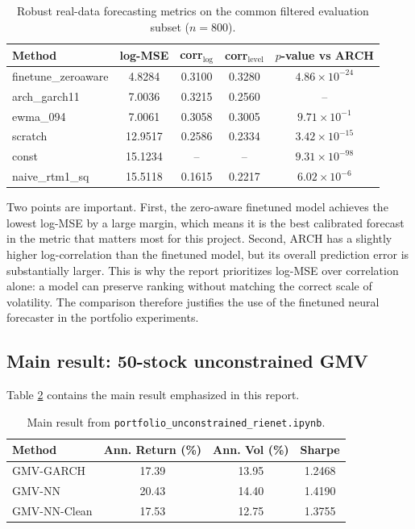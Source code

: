 \documentclass[11pt,a4paper]{article}
\begin{document}
\begin{table}[H]
\centering
\caption{Robust real-data forecasting metrics on the common filtered evaluation subset ($n=800$).}
\label{tab:real-forecast-metrics}
\small
\begin{tabular}{lcccc}
\toprule
Method & log-MSE & corr$_{\log}$ & corr$_{\mathrm{level}}$ & $p$-value vs ARCH \\
\midrule
finetune\_zeroaware & 4.8284 & 0.3100 & 0.3280 & $4.86 \times 10^{-24}$ \\
arch\_garch11 & 7.0036 & 0.3215 & 0.2560 & -- \\
ewma\_094 & 7.0061 & 0.3058 & 0.3005 & $9.71 \times 10^{-1}$ \\
scratch & 12.9517 & 0.2586 & 0.2334 & $3.42 \times 10^{-15}$ \\
const & 15.1234 & -- & -- & $9.31 \times 10^{-98}$ \\
naive\_rtm1\_sq & 15.5118 & 0.1615 & 0.2217 & $6.02 \times 10^{-6}$ \\
\bottomrule
\end{tabular}
\end{table}

Two points are important. First, the zero-aware finetuned model achieves the lowest log-MSE by a large margin, which means it is the best calibrated forecast in the metric that matters most for this project. Second, ARCH has a slightly higher log-correlation than the finetuned model, but its overall prediction error is substantially larger. This is why the report prioritizes log-MSE over correlation alone: a model can preserve ranking without matching the correct scale of volatility. The comparison therefore justifies the use of the finetuned neural forecaster in the portfolio experiments.

\subsection{Main result: 50-stock unconstrained GMV}

Table \ref{tab:main-unconstrained} contains the main result emphasized in this report.

\begin{table}[H]
\centering
\caption{Main result from \texttt{portfolio\_unconstrained\_rienet.ipynb}.}
\label{tab:main-unconstrained}
\begin{tabular}{lccc}
\toprule
Method & Ann. Return (\%) & Ann. Vol (\%) & Sharpe \\
\midrule
GMV-GARCH & 17.39 & 13.95 & 1.2468 \\
GMV-NN & 20.43 & 14.40 & 1.4190 \\
GMV-NN-Clean & 17.53 & 12.75 & 1.3755 \\
\bottomrule
\end{tabular}
\end{table}
\end{document}

